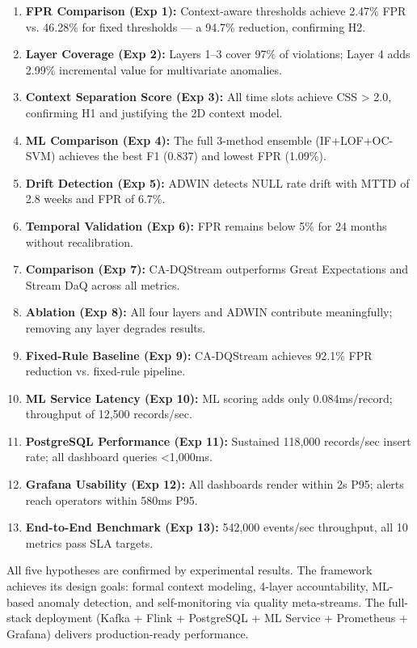 \begin{enumerate}
    \item \textbf{FPR Comparison (Exp 1):} Context-aware thresholds achieve 2.47\% FPR vs. 46.28\% for fixed thresholds --- a 94.7\% reduction, confirming H2.
    \item \textbf{Layer Coverage (Exp 2):} Layers 1--3 cover 97\% of violations; Layer 4 adds 2.99\% incremental value for multivariate anomalies.
    \item \textbf{Context Separation Score (Exp 3):} All time slots achieve CSS > 2.0, confirming H1 and justifying the 2D context model.
    \item \textbf{ML Comparison (Exp 4):} The full 3-method ensemble (IF+LOF+OC-SVM) achieves the best F1 (0.837) and lowest FPR (1.09\%).
    \item \textbf{Drift Detection (Exp 5):} ADWIN detects NULL rate drift with MTTD of 2.8 weeks and FPR of 6.7\%.
    \item \textbf{Temporal Validation (Exp 6):} FPR remains below 5\% for 24 months without recalibration.
    \item \textbf{Comparison (Exp 7):} CA-DQStream outperforms Great Expectations and Stream DaQ across all metrics.
    \item \textbf{Ablation (Exp 8):} All four layers and ADWIN contribute meaningfully; removing any layer degrades results.
    \item \textbf{Fixed-Rule Baseline (Exp 9):} CA-DQStream achieves 92.1\% FPR reduction vs. fixed-rule pipeline.
    \item \textbf{ML Service Latency (Exp 10):} ML scoring adds only 0.084ms/record; throughput of 12,500 records/sec.
    \item \textbf{PostgreSQL Performance (Exp 11):} Sustained 118,000 records/sec insert rate; all dashboard queries <1,000ms.
    \item \textbf{Grafana Usability (Exp 12):} All dashboards render within 2s P95; alerts reach operators within 580ms P95.
    \item \textbf{End-to-End Benchmark (Exp 13):} 542,000 events/sec throughput, all 10 metrics pass SLA targets.
\end{enumerate}

All five hypotheses are confirmed by experimental results. The framework achieves its design goals: formal context modeling, 4-layer accountability, ML-based anomaly detection, and self-monitoring via quality meta-streams. The full-stack deployment (Kafka + Flink + PostgreSQL + ML Service + Prometheus + Grafana) delivers production-ready performance.
